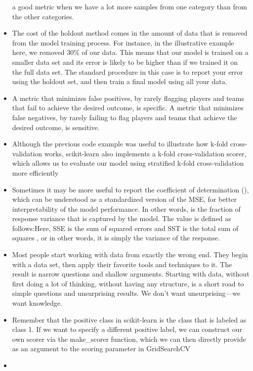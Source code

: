\documentclass[]{book}
\theoremstyle{definition}
\theoremstyle{definition}
\theoremstyle{definition}
\theoremstyle{remark}
\begin{document}
\begin{itemize}
  a good metric when we have a lot more samples from one category than
  from the other categories.
\item
  The cost of the holdout method comes in the amount of data that is
  removed from the model training process. For instance, in the
  illustrative example here, we removed 30\% of our data. This means
  that our model is trained on a smaller data set and its error is
  likely to be higher than if we trained it on the full data set. The
  standard procedure in this case is to report your error using the
  holdout set, and then train a final model using all your data.
\item
  A metric that minimizes false positives, by rarely flagging players
  and teams that fail to achieve the desired outcome, is specific. A
  metric that minimizes false negatives, by rarely failing to flag
  players and teams that achieve the desired outcome, is sensitive.
\item
  Although the previous code example was useful to illustrate how k-fold
  cross-validation works, scikit-learn also implements a k-fold
  cross-validation scorer, which allows us to evaluate our model using
  stratified k-fold cross-validation more efficiently
\item
  Sometimes it may be more useful to report the coefficient of
  determination (), which can be understood as a standardized version of
  the MSE, for better interpretability of the model performance. In
  other words, is the fraction of response variance that is captured by
  the model. The value is defined as follows:Here, SSE is the sum of
  squared errors and SST is the total sum of squares , or in other
  words, it is simply the variance of the response.
\item
  Most people start working with data from exactly the wrong end. They
  begin with a data set, then apply their favorite tools and techniques
  to it. The result is narrow questions and shallow arguments. Starting
  with data, without first doing a lot of thinking, without having any
  structure, is a short road to simple questions and unsurprising
  results. We don't want unsurprising---we want knowledge.
\item
  Remember that the positive class in scikit-learn is the class that is
  labeled as class 1. If we want to specify a different positive label,
  we can construct our own scorer via the make\_scorer function, which
  we can then directly provide as an argument to the scoring parameter
  in GridSearchCV
\item

\end{itemize}
\end{document}
